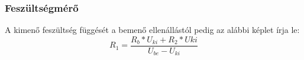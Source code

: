 \documentclass[10pt, conference,a4paper]{ITKproc}
\begin{document}
\subsubsection{Feszültségmérő}

A kimenő feszültség függését a bemenő ellenállástól pedig az alábbi képlet írja le: 
\[R_1 = \frac{R_b*U_{ki}+R_2*U{ki}}{U_{be}-U_{ki}} \]









%


\end{document}
